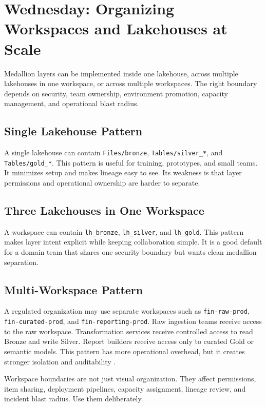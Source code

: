 \section{Wednesday: Organizing Workspaces and Lakehouses at Scale}
Medallion layers can be implemented inside one lakehouse, across multiple lakehouses in one workspace, or across multiple workspaces. The right boundary depends on security, team ownership, environment promotion, capacity management, and operational blast radius.

\subsection{Single Lakehouse Pattern}
A single lakehouse can contain \texttt{Files/bronze}, \texttt{Tables/silver\_*}, and \texttt{Tables/gold\_*}. This pattern is useful for training, prototypes, and small teams. It minimizes setup and makes lineage easy to see. Its weakness is that layer permissions and operational ownership are harder to separate.

\subsection{Three Lakehouses in One Workspace}
A workspace can contain \texttt{lh\_bronze}, \texttt{lh\_silver}, and \texttt{lh\_gold}. This pattern makes layer intent explicit while keeping collaboration simple. It is a good default for a domain team that shares one security boundary but wants clean medallion separation.

\subsection{Multi-Workspace Pattern}
A regulated organization may use separate workspaces such as \texttt{fin-raw-prod}, \texttt{fin-curated-prod}, and \texttt{fin-reporting-prod}. Raw ingestion teams receive access to the raw workspace. Transformation services receive controlled access to read Bronze and write Silver. Report builders receive access only to curated Gold or semantic models. This pattern has more operational overhead, but it creates stronger isolation and auditability \cite{microsoftFabricWorkspaces,microsoftDomains}.

\begin{notebox}
Workspace boundaries are not just visual organization. They affect permissions, item sharing, deployment pipelines, capacity assignment, lineage review, and incident blast radius. Use them deliberately.
\end{notebox}

